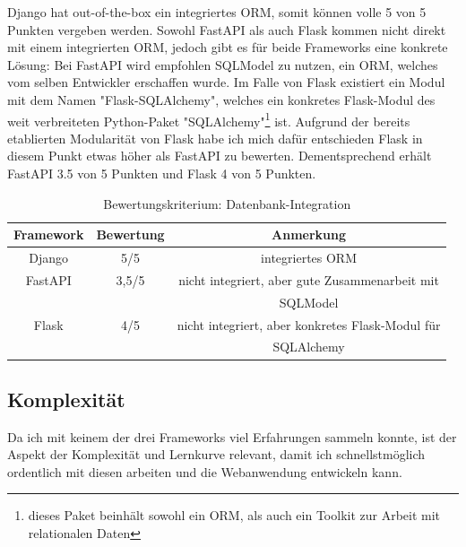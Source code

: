 \documentclass[letterpaper,11pt,leqno]{article}
\begin{document}
Django hat out-of-the-box ein integriertes ORM, somit können volle 5 von 5 Punkten vergeben werden.
Sowohl FastAPI als auch Flask kommen nicht direkt mit einem integrierten ORM, jedoch gibt es für
beide Frameworks eine konkrete Lösung: Bei FastAPI wird empfohlen SQLModel zu nutzen, ein ORM,
welches vom selben Entwickler erschaffen wurde. Im Falle von Flask existiert ein Modul mit dem Namen
"Flask-SQLAlchemy", welches ein konkretes Flask-Modul des weit verbreiteten Python-Paket
"SQLAlchemy"\footnote{dieses Paket beinhält sowohl ein ORM, als auch ein Toolkit zur Arbeit mit
relationalen Daten} ist. Aufgrund der bereits etablierten Modularität von Flask habe ich mich dafür
entschieden Flask in diesem Punkt etwas höher als FastAPI zu bewerten. Dementsprechend erhält
FastAPI 3.5 von 5 Punkten und Flask 4 von 5 Punkten.
\begin{table}[h!]
	\begin{center}
		\begin{tabular}{|c||c|c|}
			\hline
			Framework & Bewertung & Anmerkung\\
			\hline\hline
			Django & 5/5 & integriertes ORM\\
			FastAPI & 3,5/5 & nicht integriert, aber gute Zusammenarbeit mit\\
			& & SQLModel\\
			Flask & 4/5 & nicht integriert, aber konkretes Flask-Modul für\\
			& & SQLAlchemy\\
			\hline
		\end{tabular}
		\caption{Bewertungskriterium: Datenbank-Integration}
	\end{center}
	\label{table:3}
\end{table}
\clearpage

\subsection{Komplexität}
Da ich mit keinem der drei Frameworks viel Erfahrungen sammeln konnte, ist der Aspekt der
Komplexität und Lernkurve relevant, damit ich schnellstmöglich ordentlich mit diesen arbeiten und
die Webanwendung entwickeln kann.
\end{document}
